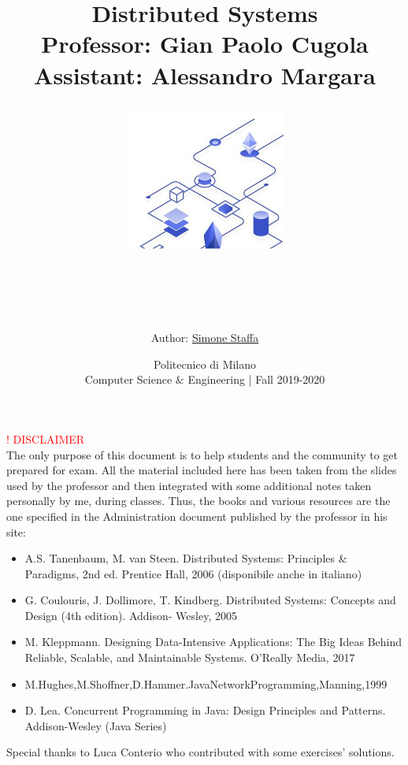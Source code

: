 \documentclass[10pt,a4paper]{article}
\author{Author: \textcolor{MidnightBlue}{\href{https://www.linkedin.com/in/simone-staffa-8b3b79158}{Simone Staffa}}}
\title{{\Huge\textbf{Distributed Systems}
\\ \LARGE Professor: Gian Paolo Cugola \\
\Large Assistant: Alessandro Margara
\begin{figure}[h!]
 \hfill \includegraphics[width=150pt]{images/distributed_systems.jpg}\hspace*{\fill}
  \label{fig:polimi}
\end{figure} \\
}}
\date{Politecnico di Milano \\ Computer Science $\&$ Engineering | Fall 2019-2020}
\begin{document}
\maketitle
\clearpage
\tableofcontents
\clearpage
\textcolor{Red}{! DISCLAIMER} \\
The only purpose of this document is to help students and the community to get prepared for exam. All the material included here has been taken from the slides used by the professor and then integrated with some additional notes taken personally by me, during classes. Thus, the books and various resources are the one specified in the Administration document published by the professor in his site:
\begin{itemize}
	\item A.S. Tanenbaum, M. van Steen. Distributed Systems: Principles \& Paradigms, 2nd ed. Prentice Hall, 2006 (disponibile anche in italiano)
	\item G. Coulouris, J. Dollimore, T. Kindberg. Distributed Systems: Concepts and Design (4th edition). Addison- Wesley, 2005
	\item M. Kleppmann. Designing Data-Intensive Applications: The Big Ideas Behind Reliable, Scalable, and Maintainable Systems. O’Really Media, 2017
	\item M.Hughes,M.Shoffner,D.Hammer.JavaNetworkProgramming,Manning,1999
	\item D. Lea. Concurrent Programming in Java: Design Principles and Patterns. Addison-Wesley (Java Series)
\end{itemize}
Special thanks to Luca Conterio who contributed with some exercises' solutions.
\clearpage
\end{document}
